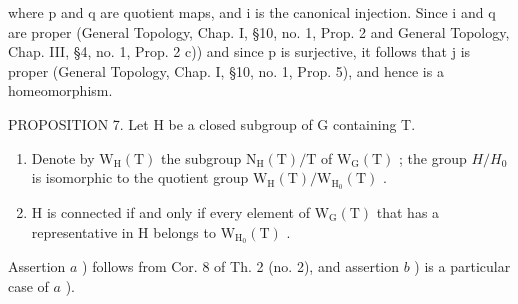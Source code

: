 where p and q are quotient maps, and i is the canonical injection. Since i and q are proper (General Topology, Chap. I, §10, no. 1, Prop. 2 and General Topology, Chap. III, §4, no. 1, Prop. 2 c)) and since p is surjective, it follows that j is proper (General Topology, Chap. I, §10, no. 1, Prop. 5), and hence is a homeomorphism.

PROPOSITION 7. Let H be a closed subgroup of G containing T.

\begin{enumerate}
\def\labelenumi{\alph{enumi})}
\item
  Denote by \(\mathrm{W}_{\mathrm{H}}(\mathrm{T})\) the subgroup \(\mathrm{N}_{\mathrm{H}}(\mathrm{T})/\mathrm{T}\) of \(\mathrm{W}_{\mathrm{G}}(\mathrm{T})\) ; the group \(H/H_{0}\) is isomorphic to the quotient group \(\mathrm{W}_{\mathrm{H}}(\mathrm{T})/\mathrm{W}_{\mathrm{H}_{0}}(\mathrm{T})\) .
\item
  H is connected if and only if every element of \(\mathrm{W}_{\mathrm{G}}(\mathrm{T})\) that has a representative in H belongs to \(\mathrm{W}_{\mathrm{H}_{0}}(\mathrm{T})\) .
\end{enumerate}

Assertion \(a\) ) follows from Cor. 8 of Th. 2 (no. 2), and assertion \(b\) ) is a particular case of \(a\) ).


